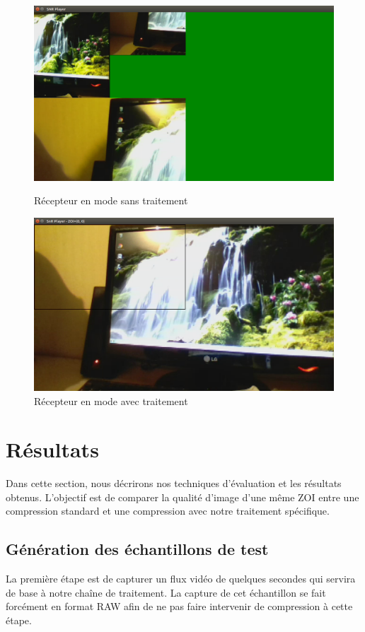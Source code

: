 \documentclass[11pt,a4paper]{article}
\begin{document}
\begin{figure}[!htb]
  \includegraphics[width=\linewidth]{images/recepteur_sans_traitement.png}
  \caption{Récepteur en mode sans traitement}
\endminipage\hfill
{}
  \includegraphics[width=\linewidth]{images/recepteur_avec_traitement.png}
  \caption{Récepteur en mode avec traitement}
\endminipage
\end{figure}

\section{Résultats}

Dans cette section, nous décrirons nos techniques d'évaluation et les résultats obtenus.
L'objectif est de comparer la qualité d'image d'une même ZOI entre une compression standard et une compression avec notre traitement spécifique.

\subsection{Génération des échantillons de test}
La première étape est de capturer un flux vidéo de quelques secondes qui servira de base à notre chaîne de traitement.
La capture de cet échantillon se fait forcément en format RAW afin de ne pas faire intervenir de compression à cette étape.
\end{document}
